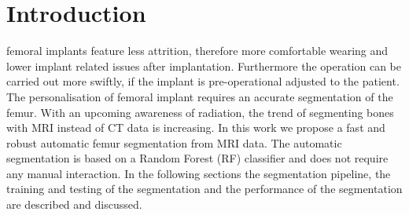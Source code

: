 \section{Introduction}
 femoral implants feature less attrition, therefore more comfortable wearing and lower implant related issues after implantation. Furthermore the operation can be carried out more swiftly, if the implant is pre-operational adjusted to the patient. The personalisation of femoral implant requires an accurate segmentation of the femur. With an upcoming awareness of radiation, the trend of segmenting bones with MRI instead of CT data is increasing.
In this work we propose a fast and robust automatic femur segmentation from MRI data. The automatic segmentation is based on a Random Forest (RF) classifier \cite{rf} and does not require any manual interaction. In the following sections the segmentation pipeline, the training and testing of the segmentation and the performance of the segmentation are described and discussed.